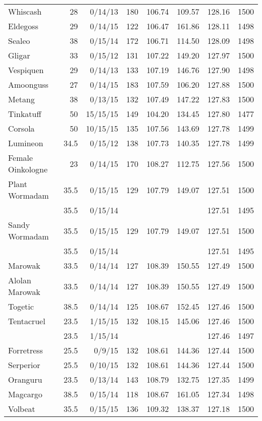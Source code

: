 \begin{longtable}{lrrrrrrr}
Whiscash & 28 & 0/14/13 & 180 & 106.74 & 109.57 & 128.16 & 1500\\
Eldegoss & 29 & 0/14/15 & 122 & 106.47 & 161.86 & 128.11 & 1498\\
Sealeo & 38 & 0/15/14 & 172 & 106.71 & 114.50 & 128.09 & 1498\\
Gligar & 33 & 0/15/12 & 131 & 107.22 & 149.20 & 127.97 & 1500\\
Vespiquen & 29 & 0/14/13 & 133 & 107.19 & 146.76 & 127.90 & 1498\\
Amoonguss & 27 & 0/14/15 & 183 & 107.59 & 106.20 & 127.88 & 1500\\
Metang & 38 & 0/13/15 & 132 & 107.49 & 147.22 & 127.83 & 1500\\
Tinkatuff & 50 & 15/15/15 & 149 & 104.20 & 134.45 & 127.80 & 1477\\
Corsola & 50 & 10/15/15 & 135 & 107.56 & 143.69 & 127.78 & 1499\\
Lumineon & 34.5 & 0/15/12 & 138 & 107.73 & 140.35 & 127.78 & 1499\\
Female Oinkologne & 23 & 0/14/15 & 170 & 108.27 & 112.75 & 127.56 & 1500\\
Plant Wormadam & 35.5 & 0/15/15 & 129 & 107.79 & 149.07 & 127.51 & 1500\\
 & 35.5 & 0/15/14 & & & & 127.51 & 1495\\
Sandy Wormadam & 35.5 & 0/15/15 & 129 & 107.79 & 149.07 & 127.51 & 1500\\
 & 35.5 & 0/15/14 & & & & 127.51 & 1495\\
Marowak & 33.5 & 0/14/14 & 127 & 108.39 & 150.55 & 127.49 & 1500\\
Alolan Marowak & 33.5 & 0/14/14 & 127 & 108.39 & 150.55 & 127.49 & 1500\\
Togetic & 38.5 & 0/14/14 & 125 & 108.67 & 152.45 & 127.46 & 1500\\
Tentacruel & 23.5 & 1/15/15 & 132 & 108.15 & 145.06 & 127.46 & 1500\\
 & 23.5 & 1/15/14 & & & & 127.46 & 1497\\
Forretress & 25.5 & 0/9/15 & 132 & 108.61 & 144.36 & 127.44 & 1500\\
Serperior & 25.5 & 0/10/15 & 132 & 108.61 & 144.36 & 127.44 & 1500\\
Oranguru & 23.5 & 0/13/14 & 143 & 108.79 & 132.75 & 127.35 & 1499\\
Magcargo & 38.5 & 0/15/14 & 118 & 108.67 & 161.05 & 127.34 & 1498\\
Volbeat & 35.5 & 0/15/15 & 136 & 109.32 & 138.37 & 127.18 & 1500\\

\end{longtable}
